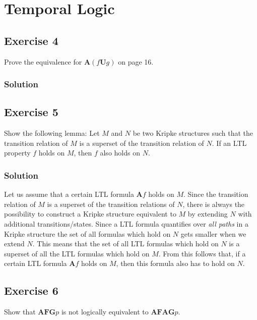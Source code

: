 \documentclass[a4paper, 12pt]{article}
\newcommand{\codeinput}[1]
{
    \begin{leftbar}
        {\fontsize{9pt}{11pt}}
    \end{leftbar}
}
\begin{document}
\codeinput{bdd_to_formula}

\section{Temporal Logic}

\subsection{Exercise 4}

Prove the equivalence for $\mathbf{A}(f \mathbf{U} g)$ on page 16.

\subsubsection{Solution}



\subsection{Exercise 5}

Show the following lemma: Let $M$ and $N$ be two Kripke structures such that
the transition relation of $M$ is a superset of the transition relation of
$N$. If an LTL property $f$ holds on $M$, then $f$ also holds on $N$.

\subsubsection{Solution}

Let us assume that a certain LTL formula $\mathbf{A}f$ holds on $M$. Since the
transition relation of $M$ is a superset of the transition relations of $N$,
there is always the possibility to construct a Kripke structure equivalent to
$M$ by extending $N$ with additional transitions/states. Since a LTL formula
quantifies over \emph{all paths} in a Kripke structure the set of all formulas
which hold on $N$ gets smaller when we extend $N$. This means that the set of
all LTL formulas which hold on $N$ is a superset of all the LTL formulas which
hold on $M$. From this follows that, if a certain LTL formula $\mathbf{A}f$
holds on $M$, then this formula also has to hold on $N$.

\subsection{Exercise 6}

Show that $\mathbf{AFG} p$ is not logically equivalent to $\mathbf{AFAG} p$.
\end{document}
